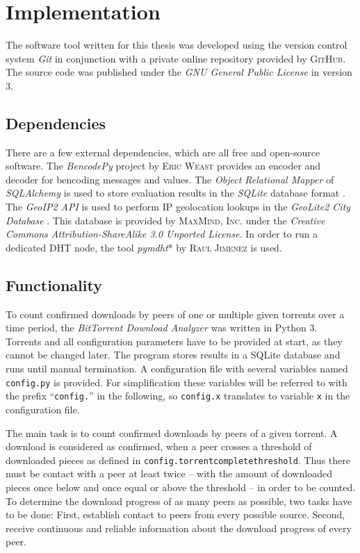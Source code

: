 \documentclass[10pt, a4paper, twoside, headsepline]{scrbook}
\renewcommand{\_}{\origunderscore\allowbreak}
\newcommand{\config}[1]{\texttt{config.\allowbreak #1}}
\begin{document}
\chapter{Implementation}
The software tool written for this thesis was developed using the version control system \emph{Git} \cite{git} in conjunction with a private online repository provided by \textsc{GitHub}. The source code was published \cite{btda} under the \emph{GNU General Public License} in version 3.

\section{Dependencies}
There are a few external dependencies, which are all free and open-source software. The \emph{BencodePy} project by \textsc{Eric Weast} \cite{bencodepy} provides an encoder and decoder for bencoding messages and values. The \emph{Object Relational Mapper} of \emph{SQLAlchemy} \cite{sqlalchemy} is used to store evaluation results in the \emph{SQLite} database format \cite{sqlite}. The \emph{GeoIP2 API} \cite{geoip2-api} is used to perform IP geolocation lookups in the \emph{GeoLite2 City Database} \cite{geolite2-db}. This database is provided by \textsc{MaxMind, Inc.} under the \emph{Creative Commons Attribution-ShareAlike 3.0 Unported License}. In order to run a dedicated DHT node, the tool \emph{pymdht}* by \textsc{Raul Jimenez} \cite{pymdht} is used.

\section{Functionality}
To count confirmed downloads by peers of one or multiple given torrents over a time period, the \emph{BitTorrent Download Analyzer} was written in Python 3. Torrents and all configuration parameters have to be provided at start, as they cannot be changed later. The program stores results in a SQLite database and runs until manual termination. A configuration file with several variables named \texttt{config.py} is provided. For simplification these variables will be referred to with the prefix ``\texttt{config.}'' in the following, so \config{x} translates to variable \texttt{x} in the configuration file.

The main task is to count confirmed downloads by peers of a given torrent. A download is considered as confirmed, when a peer crosses a threshold of downloaded pieces as defined in \config{torrent\_complete\_threshold}. Thus there must be contact with a peer at least twice -- with the amount of downloaded pieces once below and once equal or above the threshold -- in order to be counted. To determine the download progress of as many peers as possible, two tasks have to be done: First, establish contact to peers from every possible source. Second, receive continuous and reliable information about the download progress of every peer.
\end{document}
